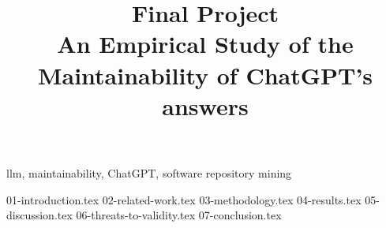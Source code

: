 \documentclass[conference]{IEEEtran}
\begin{document}
\title{Final Project\\
{\footnotesize An Empirical Study of the Maintainability of ChatGPT's answers}
}

\author{
}

\maketitle

\begin{abstract}
\end{abstract}

\begin{IEEEkeywords}
  llm, maintainability, ChatGPT, software repository mining
\end{IEEEkeywords}


{01-introduction.tex}
{02-related-work.tex}
{03-methodology.tex}
{04-results.tex}
{05-discussion.tex}
{06-threats-to-validity.tex}
{07-conclusion.tex}
\end{document}
